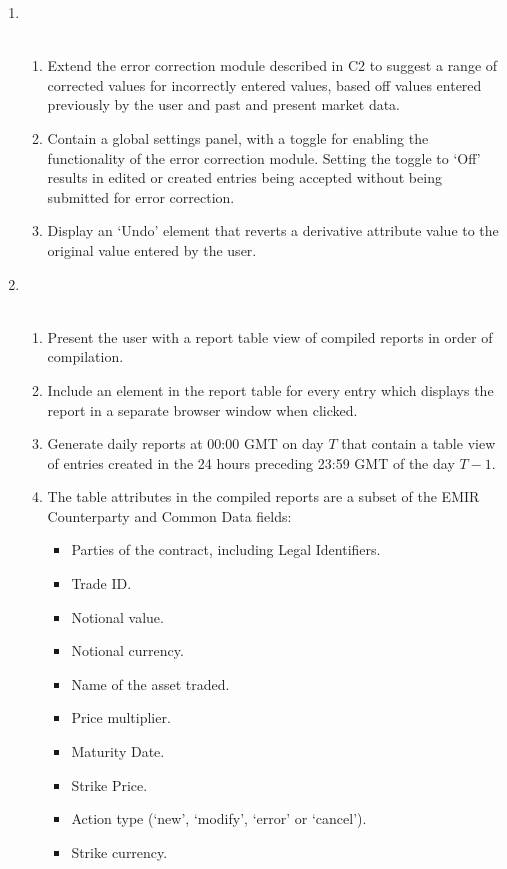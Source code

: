 \documentclass[8pt]{extarticle}
\begin{document}
\begin{enumerate}[label=C\arabic*]
\item \\\
\begin{enumerate}[label=D7.\arabic*]
\item Extend the error correction module described in C2 to suggest a range of corrected values for incorrectly entered values, based off values entered previously by the user and past and present market data. 

\item Contain a global settings panel, with a toggle for enabling the functionality of the error correction module. Setting the toggle to ‘Off’ results in edited or created entries being accepted without being submitted for error correction. 

\item Display an ‘Undo’ element that reverts a derivative attribute value to the original value entered by the user. 
\end{enumerate}

\newpage
\item \\\
\begin{enumerate}[label=D8.\arabic*]
\item Present the user with a report table view of compiled reports in order of compilation. 

\item Include an element in the report table for every entry which displays the report in a separate browser window when clicked.  

\item Generate daily reports at 00:00 GMT on day $T$ that contain a table view of entries created in the 24 hours preceding 23:59 GMT of the day $T-1$.  

\item The table attributes in the compiled reports are a subset of the EMIR Counterparty and Common Data fields: 

\begin{itemize}
\item Parties of the contract, including Legal Identifiers. 
\item Trade ID. 
\item Notional value. 
\item Notional currency. 
\item Name of the asset traded. 
\item Price multiplier. 
\item Maturity Date. 
\item Strike Price. 
\item Action type (‘new’, ‘modify’, ‘error’ or ‘cancel’). 
\item Strike currency. 
\end{itemize}


\end{enumerate}
\end{enumerate}
\end{document}
